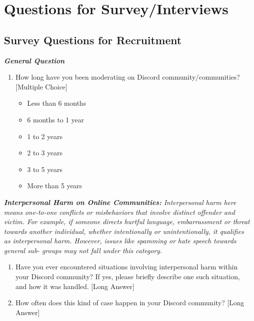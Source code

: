 \section{Questions for Survey/Interviews}
\subsection{Survey Questions for Recruitment}
\textbf{\textit{General Question}}
\begin{enumerate}
    \item How long have you been moderating on Discord community/communities? [Multiple Choice]
    \begin{itemize}
        \item Less than 6 months
        \item 6 months to 1 year
        \item 1 to 2 years
        \item 2 to 3 years
        \item 3 to 5 years
        \item More than 5 years
    \end{itemize}
\end{enumerate}

\textit{\textbf{Interpersonal Harm on Online Communities:} Interpersonal harm here means one-to-one conflicts or misbehaviors that involve distinct offender and victim. For example, if someone directs hurtful language, embarrassment or threat towards another individual, whether intentionally or unintentionally, it qualifies as interpersonal harm. However, issues like spamming or hate speech towards general sub- groups may not fall under this category.}

\begin{enumerate}
    \item Have you ever encountered situations involving interpersonal harm within your Discord community? If yes, please briefly describe one such situation, and how it was handled. [Long Answer]
    \item How often does this kind of case happen in your Discord community? [Long Answer]
\end{enumerate}

